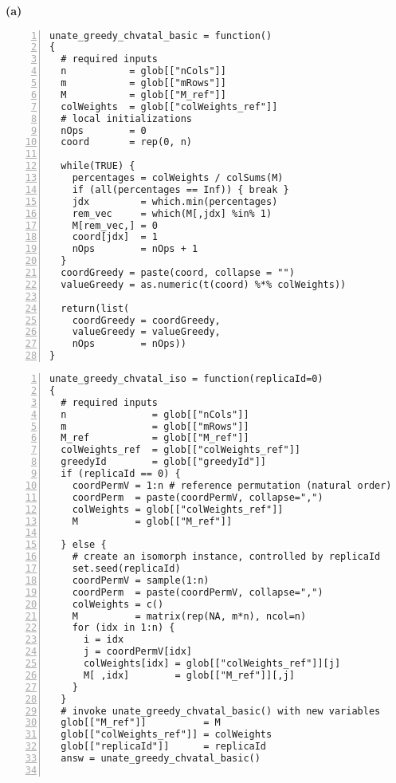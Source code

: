 
\begin{figure*}[t!]
\vspace*{-9ex} 
\hspace*{-2.1em}
\begin{minipage}{0.51\textwidth}
\centering

{\large\bf  (a) }
\vspace*{-1ex} 
\begin{Verbatim}[frame=lines, fontsize=\footnotesize,numbers=left,
numbersep=3pt,firstline=1,xleftmargin=9mm]
unate_greedy_chvatal_basic = function() 
{
  # required inputs
  n           = glob[["nCols"]]
  m           = glob[["mRows"]]
  M           = glob[["M_ref"]]
  colWeights  = glob[["colWeights_ref"]]  
  # local initializations
  nOps        = 0
  coord       = rep(0, n)
  
  while(TRUE) {
    percentages = colWeights / colSums(M) 
    if (all(percentages == Inf)) { break }
    jdx         = which.min(percentages)
    rem_vec     = which(M[,jdx] %in% 1)
    M[rem_vec,] = 0
    coord[jdx]  = 1
    nOps        = nOps + 1
  }
  coordGreedy = paste(coord, collapse = "")
  valueGreedy = as.numeric(t(coord) %*% colWeights))
  
  return(list(
    coordGreedy = coordGreedy, 
    valueGreedy = valueGreedy,
    nOps        = nOps))
} 
\end{Verbatim}
\vspace*{-6.5ex}
\begin{Verbatim}[frame=lines, fontsize=\footnotesize,numbers=left,
numbersep=3pt,firstline=1,xleftmargin=9mm]
unate_greedy_chvatal_iso = function(replicaId=0) 
{  
  # required inputs 
  n               = glob[["nCols"]]
  m               = glob[["mRows"]]
  M_ref           = glob[["M_ref"]]
  colWeights_ref  = glob[["colWeights_ref"]]
  greedyId        = glob[["greedyId"]]   
  if (replicaId == 0) {
    coordPermV = 1:n # reference permutation (natural order)
    coordPerm  = paste(coordPermV, collapse=",")
    colWeights = glob[["colWeights_ref"]] 
    M          = glob[["M_ref"]]
 
  } else {
    # create an isomorph instance, controlled by replicaId
    set.seed(replicaId)
    coordPermV = sample(1:n)
    coordPerm  = paste(coordPermV, collapse=",")
    colWeights = c()
    M          = matrix(rep(NA, m*n), ncol=n)
    for (idx in 1:n) {
      i = idx
      j = coordPermV[idx] 
      colWeights[idx] = glob[["colWeights_ref"]][j]
      M[ ,idx]        = glob[["M_ref"]][,j]
    }
  }
  # invoke unate_greedy_chvatal_basic() with new variables 
  glob[["M_ref"]]          = M
  glob[["colWeights_ref"]] = colWeights
  glob[["replicaId"]]      = replicaId 
  answ = unate_greedy_chvatal_basic()
  

\end{Verbatim}
\end{minipage}
\end{figure*}
